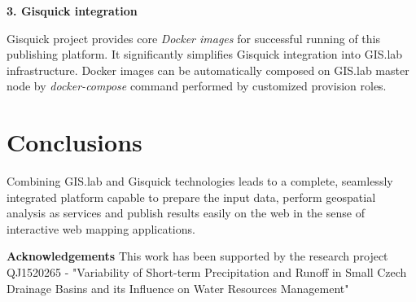 \documentclass{tudelftposter}
\begin{document}
\vskip 0.1in

\textbf{3. Gisquick integration}

Gisquick project provides core \textit{Docker images} for successful
running of this publishing platform. It significantly simplifies
Gisquick integration into GIS.lab infrastructure. Docker images can be
automatically composed on GIS.lab master node by
\textit{docker-compose} command performed by customized provision
roles.

\section{Conclusions}

Combining GIS.lab and Gisquick technologies leads to a complete,
seamlessly integrated platform capable to prepare the input data,
perform geospatial analysis as services and publish results easily on
the web in the sense of interactive web mapping applications.

{\footnotesize \textbf{Acknowledgements} This work has been supported by the research
project QJ1520265 - "Variability of Short-term Precipitation and
Runoff in Small Czech Drainage Basins and its Influence on Water
Resources Management"}
\end{document}
